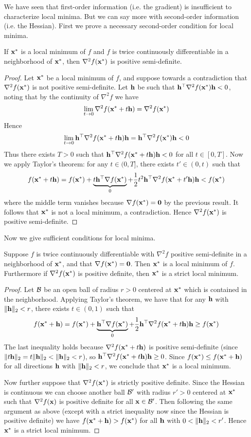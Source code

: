 We have seen that first-order information (i.e. the gradient) is insufficient to characterize local minima.
But we can say more with second-order information (i.e. the Hessian).
First we prove a necessary second-order condition for local minima.
\begin{proposition}
If $\mathbf{x}^*$ is a local minimum of $f$ and $f$ is twice continuously differentiable in a neighborhood of $\mathbf{x}^*$, then $\nabla^2 f(\mathbf{x}^*)$ is positive semi-definite.
\end{proposition}
\begin{proof}
Let $\mathbf{x}^*$ be a local minimum of $f$, and suppose towards a contradiction that $\nabla^2 f(\mathbf{x}^*)$ is not positive semi-definite.
Let $\mathbf{h}$ be such that $\mathbf{h}^\top\nabla^2 f(\mathbf{x}^*)\mathbf{h} < 0$, noting that by the continuity of $\nabla^2 f$ we have
\[\lim_{t \to 0} \nabla^2 f(\mathbf{x}^* + t\mathbf{h}) = \nabla^2 f(\mathbf{x}^*)\]
Hence
\[\lim_{t \to 0} \mathbf{h}^\top\nabla^2 f(\mathbf{x}^* + t\mathbf{h})\mathbf{h} = \mathbf{h}^\top\nabla^2 f(\mathbf{x}^*)\mathbf{h} < 0\]
Thus there exists $T > 0$ such that $\mathbf{h}^\top\nabla^2 f(\mathbf{x}^* + t\mathbf{h})\mathbf{h} < 0$ for all $t \in [0,T]$.
Now we apply Taylor's theorem: for any $t \in (0,T]$, there exists $t' \in (0,t)$ such that
\[f(\mathbf{x}^* + t\mathbf{h}) = f(\mathbf{x}^*) + \underbrace{t\mathbf{h}^\top\nabla f(\mathbf{x}^*)}_0 + \frac{1}{2}t^2\mathbf{h}^\top\nabla^2 f(\mathbf{x}^* + t'\mathbf{h})\mathbf{h} < f(\mathbf{x}^*)\]
where the middle term vanishes because $\nabla f(\mathbf{x}^*) = \mathbf{0}$ by the previous result.
It follows that $\mathbf{x}^*$ is not a local minimum, a contradiction.
Hence $\nabla^2 f(\mathbf{x}^*)$ is positive semi-definite.
\end{proof}
Now we give sufficient conditions for local minima.
\begin{proposition}
Suppose $f$ is twice continuously differentiable with $\nabla^2 f$ positive semi-definite in a neighborhood of $\mathbf{x}^*$, and that $\nabla f(\mathbf{x}^*) = \mathbf{0}$.
Then $\mathbf{x}^*$ is a local minimum of $f$.
Furthermore if $\nabla^2 f(\mathbf{x}^*)$ is positive definite, then $\mathbf{x}^*$ is a strict local minimum.
\end{proposition}
\begin{proof}
Let $\mathcal{B}$ be an open ball of radius $r > 0$ centered at $\mathbf{x}^*$ which is contained in the neighborhood.
Applying Taylor's theorem, we have that for any $\mathbf{h}$ with $\|\mathbf{h}\|_2 < r$, there exists $t \in (0,1)$ such that
\[f(\mathbf{x}^* + \mathbf{h}) = f(\mathbf{x}^*) + \underbrace{\mathbf{h}^\top\nabla f(\mathbf{x}^*)}_0 + \frac{1}{2}\mathbf{h}^\top\nabla^2 f(\mathbf{x}^* + t\mathbf{h})\mathbf{h} \geq f(\mathbf{x}^*)\]
The last inequality holds because $\nabla^2 f(\mathbf{x}^* + t\mathbf{h})$ is positive semi-definite (since $\|t\mathbf{h}\|_2 = t\|\mathbf{h}\|_2 < \|\mathbf{h}\|_2 < r$), so $\mathbf{h}^\top\nabla^2 f(\mathbf{x}^* + t\mathbf{h})\mathbf{h} \geq 0$.
Since $f(\mathbf{x}^*) \leq f(\mathbf{x}^* + \mathbf{h})$ for all directions $\mathbf{h}$ with $\|\mathbf{h}\|_2 < r$, we conclude that $\mathbf{x}^*$ is a local minimum.

Now further suppose that $\nabla^2 f(\mathbf{x}^*)$ is strictly positive definite.
Since the Hessian is continuous we can choose another ball $\mathcal{B}'$ with radius $r' > 0$ centered at $\mathbf{x}^*$ such that $\nabla^2 f(\mathbf{x})$ is positive definite for all $\mathbf{x} \in \mathcal{B}'$.
Then following the same argument as above (except with a strict inequality now since the Hessian is positive definite) we have $f(\mathbf{x}^* + \mathbf{h}) > f(\mathbf{x}^*)$ for all $\mathbf{h}$ with $0 < \|\mathbf{h}\|_2 < r'$.
Hence $\mathbf{x}^*$ is a strict local minimum.
\end{proof}
